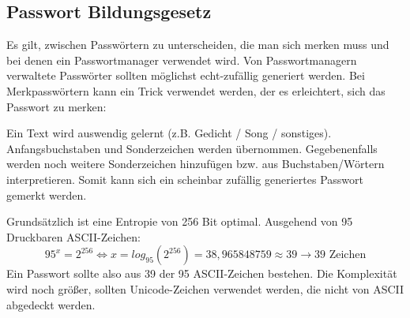 \subsection{Passwort Bildungsgesetz}

Es gilt, zwischen Passwörtern zu unterscheiden, die man sich merken muss und bei denen ein Passwortmanager verwendet wird. Von Passwortmanagern verwaltete Passwörter sollten möglichst echt-zufällig generiert werden. Bei Merkpasswörtern kann ein Trick verwendet werden, der es erleichtert, sich das Passwort zu merken:

Ein Text wird auswendig gelernt (z.B.  Gedicht / Song / sonstiges). Anfangsbuchstaben und Sonderzeichen werden übernommen. Gegebenenfalls werden noch weitere Sonderzeichen hinzufügen bzw. aus Buchstaben/Wörtern interpretieren. Somit kann sich ein scheinbar zufällig generiertes Passwort gemerkt werden. 

Grundsätzlich ist eine Entropie von 256 Bit optimal. Ausgehend von 95 Druckbaren ASCII-Zeichen:
$$
95^x = 2^{256} \Leftrightarrow x = log_{95}(2^{256}) = 38,965848759 \approx 39 \rightarrow 39 \text{ Zeichen}
$$
Ein Passwort sollte also aus 39 der 95 ASCII-Zeichen bestehen. Die Komplexität wird noch größer, sollten Unicode-Zeichen verwendet werden, die nicht von ASCII abgedeckt werden.

